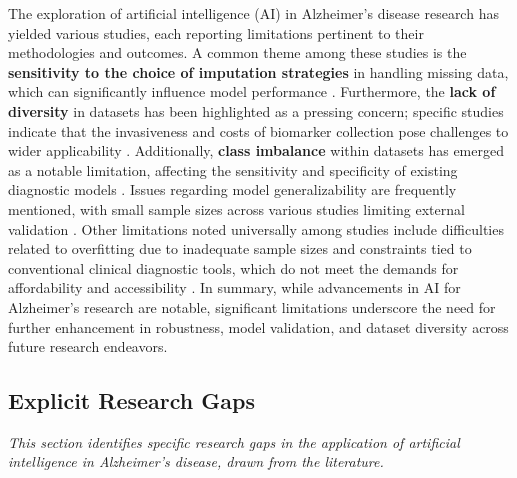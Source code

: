 \documentclass{MITcsail}
\begin{document}
The exploration of artificial intelligence (AI) in Alzheimer's disease research has yielded various studies, each reporting limitations pertinent to their methodologies and outcomes. A common theme among these studies is the \textbf{sensitivity to the choice of imputation strategies} in handling missing data, which can significantly influence model performance \citep{ref_10_1016_j_neuroimage_2020_117203}. Furthermore, the \textbf{lack of diversity} in datasets has been highlighted as a pressing concern; specific studies indicate that the invasiveness and costs of biomarker collection pose challenges to wider applicability \citep{ref_10_1002_alz_13390}. Additionally, \textbf{class imbalance} within datasets has emerged as a notable limitation, affecting the sensitivity and specificity of existing diagnostic models \citep{ref_10_1109_access_2021_3090474}. Issues regarding model generalizability are frequently mentioned, with small sample sizes across various studies limiting external validation \citep{ref_10_1016_j_ejrad_2023_110934}. Other limitations noted universally among studies include difficulties related to overfitting due to inadequate sample sizes \citep{ref_10_3390_brainsci10020084} and constraints tied to conventional clinical diagnostic tools, which do not meet the demands for affordability and accessibility \citep{ref_10_1038_s41598_020_80312_2}. In summary, while advancements in AI for Alzheimer's research are notable, significant limitations underscore the need for further enhancement in robustness, model validation, and dataset diversity across future research endeavors.

\subsection{Explicit Research Gaps}

\textit{This section identifies specific research gaps in the application of artificial intelligence in Alzheimer's disease, drawn from the literature.}
\end{document}
